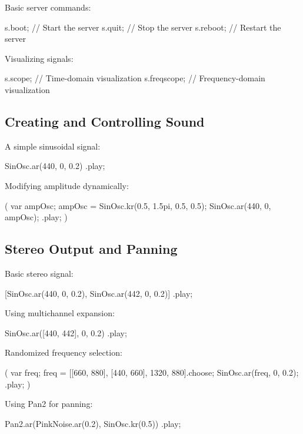 Basic server commands:

\begin{supercollider*}
s.boot; // Start the server
s.quit; // Stop the server
s.reboot; // Restart the server
\end{supercollider*}

Visualizing signals:

\begin{supercollider*}
s.scope; // Time-domain visualization
s.freqscope; // Frequency-domain visualization
\end{supercollider*}

\subsection{Creating and Controlling Sound}

A simple sinusoidal signal:

\begin{supercollider*}
{ SinOsc.ar(440, 0, 0.2) }.play;
\end{supercollider*}

Modifying amplitude dynamically:

\begin{supercollider*}
(
{ var ampOsc;
  ampOsc = SinOsc.kr(0.5, 1.5pi, 0.5, 0.5);
  SinOsc.ar(440, 0, ampOsc);
}.play;
)
\end{supercollider*}

\subsection{Stereo Output and Panning}

Basic stereo signal:

\begin{supercollider*}
{ [SinOsc.ar(440, 0, 0.2), SinOsc.ar(442, 0, 0.2)] }.play;
\end{supercollider*}

Using multichannel expansion:

\begin{supercollider*}
{ SinOsc.ar([440, 442], 0, 0.2) }.play;
\end{supercollider*}

Randomized frequency selection:

\begin{supercollider*}
(
{ var freq;
  freq = [[660, 880], [440, 660], 1320, 880].choose;
  SinOsc.ar(freq, 0, 0.2);
}.play;
)
\end{supercollider*}

Using Pan2 for panning:

\begin{supercollider*}
{ Pan2.ar(PinkNoise.ar(0.2), SinOsc.kr(0.5)) }.play;
\end{supercollider*}

